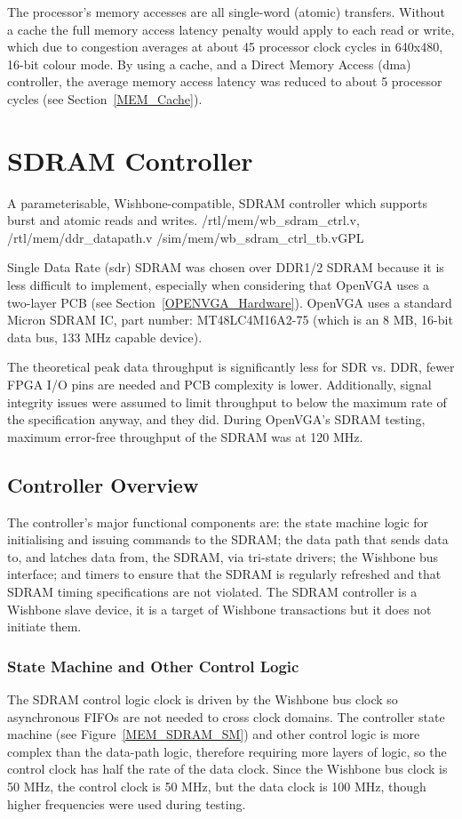 The processor's memory accesses are all single-word (atomic) transfers. Without a
cache the full memory access latency penalty would apply to each read or write,
which due to congestion averages at about 45 processor clock cycles in 640x480,
16-bit colour mode. By using a cache, and a Direct Memory
Access (\gls{dma}) controller,
the average memory access latency was reduced to about 5 processor cycles (see
Section~\ref{MEM_Cache}).


\section{SDRAM Controller}
\label{MEM_SDRAM}

{A parameterisable, Wishbone-compatible, SDRAM controller which supports burst
and atomic reads and writes.} {/rtl/mem/wb\_sdram\_ctrl.v, /rtl/mem/ddr\_datapath.v}
{/sim/mem/wb\_sdram\_ctrl\_tb.v}{GPL}

Single Data Rate (\gls{sdr}) SDRAM
was chosen over DDR1/2 SDRAM because it is less difficult to implement,
especially when considering that OpenVGA uses a two-layer PCB (see
Section~\ref{OPENVGA_Hardware}). OpenVGA uses a standard Micron SDRAM IC, part
number: MT48LC4M16A2-75 (which is an 8 MB, 16-bit data bus, 133 MHz capable
device\cite{Micron_SDRAM_DS}).

The theoretical peak data throughput is significantly less for SDR vs. DDR, fewer
FPGA I/O pins are needed and PCB complexity is lower. Additionally, signal
integrity issues were assumed to limit throughput to below the maximum rate of
the specification anyway, and they did. During OpenVGA's SDRAM testing, maximum
error-free throughput of the SDRAM was at 120 MHz.


\subsection{Controller Overview}
\label{SDRAM_Crtl}

The controller's major functional components are: the state machine logic for
initialising and issuing commands to the SDRAM; the data path that sends data to,
and latches data from, the SDRAM, via tri-state drivers; the Wishbone bus
interface; and timers to ensure that the SDRAM is regularly refreshed and that
SDRAM timing specifications are not violated. The SDRAM controller is a Wishbone
slave device, it is a target of Wishbone transactions but it does not initiate
them.


\subsubsection{State Machine and Other Control Logic}
The SDRAM control logic clock is driven by the Wishbone bus clock so asynchronous
FIFOs are not needed to cross clock domains. The controller state machine (see
Figure~\ref{MEM_SDRAM_SM}) and other control logic is more complex than the
data-path logic, therefore requiring more layers of logic, so the control clock
has half the rate of the data clock. Since the Wishbone bus clock is 50 MHz, the
control clock is 50 MHz, but the data clock is 100 MHz, though higher frequencies
were used during testing.

